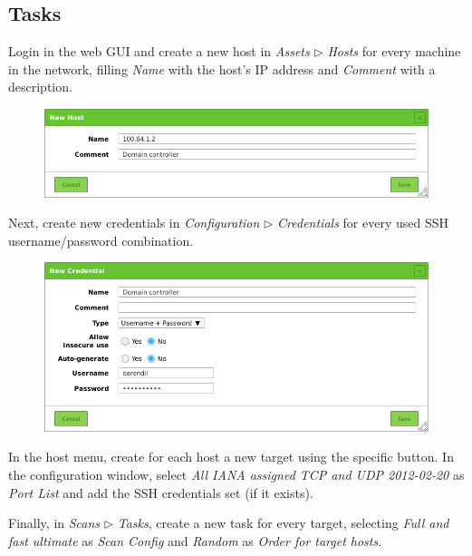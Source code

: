 \documentclass[draft]{homework}
\begin{document}
    \subsection{Tasks}
    Login in the web GUI and create a new host in \textit{Assets} $\triangleright$ \textit{Hosts} for every machine in the network, filling \textit{Name} with the host's IP address and \textit{Comment} with a description.
    \vspace{-5pt}
    \begin{figure}[H]
        \centering
        \includegraphics[width=1\linewidth]{images/new-host}
        \label{fig:new-host}
    \end{figure}
    \vspace{-20pt}
    
    Next, create new credentials in \textit{Configuration} $\triangleright$ \textit{Credentials} for every used SSH username/password combination.
    \vspace{-5pt}
    \begin{figure}[H]
        \centering
        \includegraphics[width=1\linewidth]{images/new-credentials}
        \label{fig:new-credentials}
    \end{figure}
    \vspace{-20pt}
    
    In the host menu, create for each host a new target using the specific button.
    In the configuration window, select \textit{All IANA assigned TCP and UDP 2012-02-20} as \textit{Port List} and add the SSH credentials set (if it exists).
    
    Finally, in \textit{Scans} $\triangleright$ \textit{Tasks}, create a new task for every target, selecting \textit{Full and fast ultimate} as \textit{Scan Config} and \textit{Random} as \textit{Order for target hosts}.
    
\end{document}
